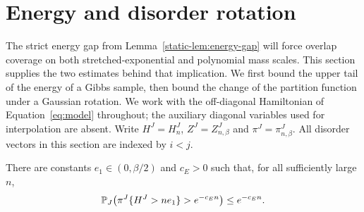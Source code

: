 \section{Energy and disorder rotation}\label{sec:energy}
The strict energy gap from Lemma~\ref{static-lem:energy-gap} will force
overlap coverage on both stretched-exponential and polynomial mass scales.
This section supplies the two estimates behind that implication. We first
bound the upper tail of the energy of a Gibbs sample, then bound the
change of the partition function under a Gaussian rotation. We work with
the off-diagonal Hamiltonian of Equation~\eqref{eq:model} throughout;
the auxiliary diagonal variables used for interpolation are absent.
Write $H^J=H_n^J$, $Z^J=Z_{n,\beta}^J$ and $\pi^J=\pi_{n,\beta}^J$.
All disorder vectors in this section are indexed by $i<j$.

\begin{lemma}\label{static-lem:coverage-energy}
There are constants $e_1\in(0,\beta/2)$ and $c_E>0$ such that, for all
sufficiently large $n$,
\begin{equation}\label{static-eq:coverage-energy-good}
 \mathbb P_J\!\left(\pi^J\{H^J>ne_1\}>e^{-c_E n}\right)
 \le e^{-c_E n}.
\end{equation}
\end{lemma}

